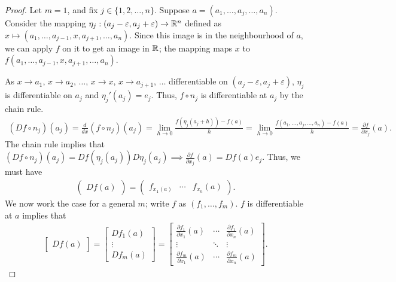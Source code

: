 \begin{proof}
    Let $m = 1$, and fix $j \in \{1,2,\ldots,n\}$. Suppose $a = (a_{1},\ldots,a_{j},\ldots,a_{n})$. Consider the mapping $\eta_{j}:(a_{j}-\varepsilon,a_{j}+\varepsilon) \to \mathbb{R}^{n}$ defined as $x \mapsto (a_{1},\ldots,a_{j-1},x,a_{j+1},\ldots,a_{n})$. Since this image is in the neighbourhood of $a$, we can apply $f$ on it to get an image in $\mathbb{R}$; the mapping maps $x$ to $f(a_{1},\ldots,a_{j-1},x,a_{j+1},\ldots,a_{n})$.

    As $x \to a_{1}$, $x \to a_{2}$, $\ldots$, $x \to x$, $x \to a_{j+1}$, $\ldots$ differentiable on $(a_{j}-\varepsilon,a_{j}+\varepsilon)$, $\eta_{j}$ is differentiable on $a_{j}$ and $\eta_{j}'(a_{j}) = e_{j}$. Thus, $f \circ n_{j}$ is differentiable at $a_{j}$ by the chain rule.
    \begin{align}
        (Df \circ n_{j}) (a_{j}) = \frac{d}{dx} (f \circ n_{j})(a_{j}) = \lim_{h \to 0} \frac{f(\eta_{j}(a_{j}+h)) - f(a)}{h} = \lim_{h \to 0} \frac{f(a_{1},\ldots,a_{j},\ldots,a_{n})-f(a)}{h} = \frac{\partial f}{\partial x_{j}}(a).
    \end{align}
    The chain rule implies that $(Df \circ n_{j})(a_{j}) = Df(\eta_{j}(a_{j})) D\eta_{j}(a_{j}) \implies \frac{\partial f}{\partial x_{j}}(a) = Df(a) e_{j}$. Thus, we must have
    \begin{align}
        \begin{pmatrix}
            Df(a)
        \end{pmatrix} = \begin{pmatrix}
            f_{x_{1}(a)} & \cdots & f_{x_{n}}(a)
        \end{pmatrix}.
    \end{align}
    We now work the case for a general $m$; write $f$ as $(f_{1},\ldots,f_{m})$. $f$ is differentiable at $a$ implies that
    \begin{align}
        \begin{bmatrix}
            Df(a)
        \end{bmatrix} = \begin{bmatrix}
            Df_{1}(a) \\ \vdots \\ Df_{m}(a)
        \end{bmatrix} = \begin{bmatrix}
            \frac{\partial f_{1}}{\partial x_{1}}(a) & \cdots & \frac{\partial f_{1}}{\partial x_{n}}(a) \\
            \vdots & \ddots & \vdots \\
            \frac{\partial f_{m}}{\partial x_{1}}(a) & \cdots & \frac{\partial f_{m}}{\partial x_{n}}(a)
        \end{bmatrix}.
    \end{align}
\end{proof}

